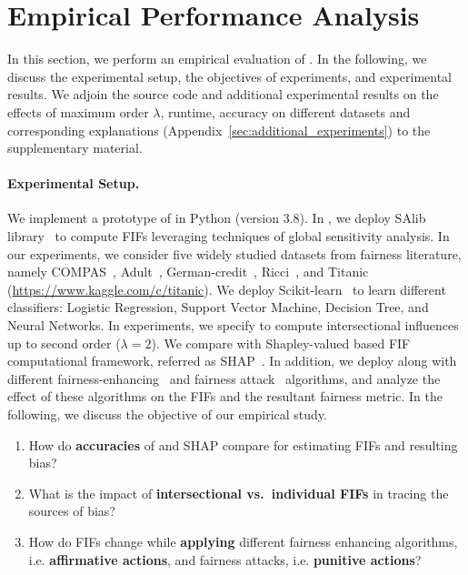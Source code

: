 \section{Empirical Performance Analysis}\label{sec:experiments}
In this section, we perform an empirical evaluation of {\fairXplainer}. In the following, we discuss the experimental setup, the objectives of experiments, and experimental results. { We adjoin the source code and additional experimental results on the effects of maximum order $\lambda$, runtime, accuracy on different datasets and corresponding explanations (Appendix~\ref{sec:additional_experiments}) to the supplementary material.}

\paragraph{Experimental Setup.} We implement a prototype of {\fairXplainer} in Python (version $ 3.8 $). In {\fairXplainer}, we deploy SAlib library~\cite{Herman2017} to compute FIFs leveraging techniques of global sensitivity analysis. In our experiments, we consider five widely studied datasets from fairness literature, namely COMPAS~\cite{angwin2016machine}, Adult~\cite{DK2017uci}, German-credit~\cite{DK2017}, Ricci~\cite{mcginley2010ricci}, and Titanic (\url{https://www.kaggle.com/c/titanic}). We deploy Scikit-learn~\cite{scikit-learn} to learn different classifiers: Logistic Regression, Support Vector Machine, Decision Tree, and Neural Networks. In experiments, we specify {\fairXplainer} to compute intersectional influences up to second order ($ \lambda = 2 $). We compare {\fairXplainer} with Shapley-valued based FIF computational framework, referred as SHAP~\cite{lundberg2020explaining}. In addition, we deploy {\fairXplainer} along with different fairness-enhancing~\cite{kamiran2012data} and fairness attack~\cite{solans2020poisoning} algorithms, and analyze the effect of these algorithms on the FIFs and the resultant fairness metric. In the following, we discuss the objective of our empirical study. 

\begin{enumerate}
	\item How do \textbf{accuracies} of {\fairXplainer} and SHAP compare for estimating FIFs and resulting bias?
	\item What is the impact of\textbf{ intersectional vs.\ individual FIFs} in tracing the sources of bias?
    \item How do FIFs change while \textbf{applying} different fairness enhancing algorithms, i.e. \textbf{affirmative actions}, and fairness attacks, i.e. \textbf{punitive actions}?
\end{enumerate}

